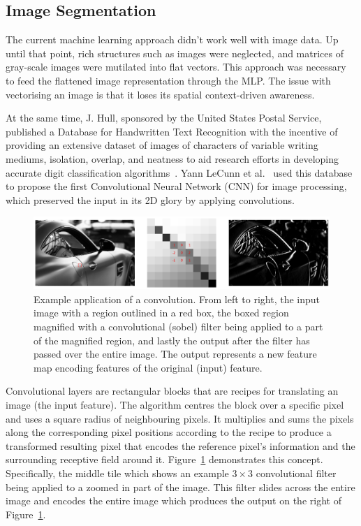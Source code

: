 \documentclass[12pt,twoside]{report}
\begin{document}
\subsection{Image Segmentation}\label{sect:image-segmentation}

The current machine learning approach didn't work well with image data. Up until that point, rich structures such as images were neglected, and matrices of gray-scale images were mutilated into flat vectors. This approach was necessary to feed the flattened image representation through the MLP. The issue with vectorising an image is that it loses its spatial context-driven awareness. 

At the same time, J. Hull, sponsored by the United States Postal Service, published a Database for Handwritten Text Recognition with the incentive of providing an extensive dataset of images of characters of variable writing mediums, isolation, overlap, and neatness to aid research efforts in developing accurate digit classification algorithms~\cite{JJHull1994}. Yann LeCunn et al.~\cite{Lenet1998} used this database to propose the first Convolutional Neural Network (CNN) for image processing, which preserved the input in its 2D glory by applying convolutions.

\begin{figure}
  \centering
  \includegraphics[width=1\linewidth]{../figures/sobel.png}
  \caption{Example application of a convolution. From left to right, the input image with a region outlined in a red box, the boxed region magnified with a convolutional (sobel) filter being applied to a part of the magnified region, and lastly the output after the filter has passed over the entire image. The output represents a new feature map encoding features of the original (input) feature.}\label{fig:sobel}
\end{figure}

Convolutional layers are rectangular blocks that are recipes for translating an image (the input feature). The algorithm centres the block over a specific pixel and uses a square radius of neighbouring pixels. It multiplies and sums the pixels along the corresponding pixel positions according to the recipe to produce a transformed resulting pixel that encodes the reference pixel's information and the surrounding receptive field around it. Figure~\ref{fig:sobel} demonstrates this concept. Specifically, the middle tile which shows an example $3 \times 3$ convolutional filter being applied to a zoomed in part of the image. This filter slides across the entire image and encodes the entire image which produces the output on the right of Figure~\ref{fig:sobel}. 
\end{document}
